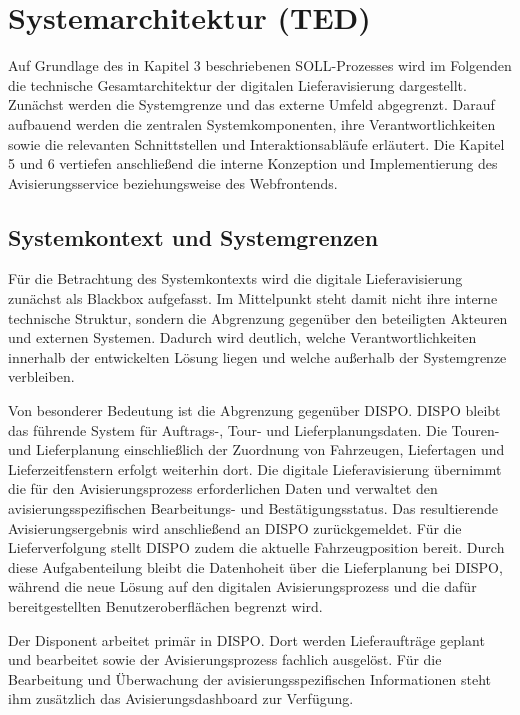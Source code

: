 \section{Systemarchitektur (TED)}
\label{sec:systemarchitektur}

Auf Grundlage des in Kapitel 3 beschriebenen SOLL-Prozesses wird im Folgenden
die technische Gesamtarchitektur der digitalen Lieferavisierung dargestellt.
Zunächst werden die Systemgrenze und das externe Umfeld abgegrenzt. Darauf
aufbauend werden die zentralen Systemkomponenten, ihre Verantwortlichkeiten
sowie die relevanten Schnittstellen und Interaktionsabläufe erläutert. Die
Kapitel 5 und 6 vertiefen anschließend die interne Konzeption und
Implementierung des Avisierungsservice beziehungsweise des Webfrontends.

\subsection{Systemkontext und Systemgrenzen}
\label{sec:systemkontext-systemgrenzen}

Für die Betrachtung des Systemkontexts wird die digitale Lieferavisierung
zunächst als Blackbox aufgefasst. Im Mittelpunkt steht damit nicht ihre interne
technische Struktur, sondern die Abgrenzung gegenüber den beteiligten Akteuren
und externen Systemen. Dadurch wird deutlich, welche Verantwortlichkeiten
innerhalb der entwickelten Lösung liegen und welche außerhalb der Systemgrenze
verbleiben.

Von besonderer Bedeutung ist die Abgrenzung gegenüber DISPO. DISPO bleibt das
führende System für Auftrags-, Tour- und Lieferplanungsdaten. Die Touren- und
Lieferplanung einschließlich der Zuordnung von Fahrzeugen, Liefertagen und
Lieferzeitfenstern erfolgt weiterhin dort. Die digitale Lieferavisierung
übernimmt die für den Avisierungsprozess erforderlichen Daten und verwaltet den
avisierungsspezifischen Bearbeitungs- und Bestätigungsstatus. Das resultierende
Avisierungsergebnis wird anschließend an DISPO zurückgemeldet. Für die
Lieferverfolgung stellt DISPO zudem die aktuelle Fahrzeugposition bereit. Durch
diese Aufgabenteilung bleibt die Datenhoheit über die Lieferplanung bei DISPO,
während die neue Lösung auf den digitalen Avisierungsprozess und die dafür
bereitgestellten Benutzeroberflächen begrenzt wird.

Der Disponent arbeitet primär in DISPO. Dort werden Lieferaufträge geplant und
bearbeitet sowie der Avisierungsprozess fachlich ausgelöst. Für die Bearbeitung
und Überwachung der avisierungsspezifischen Informationen steht ihm zusätzlich
das Avisierungsdashboard zur Verfügung.

